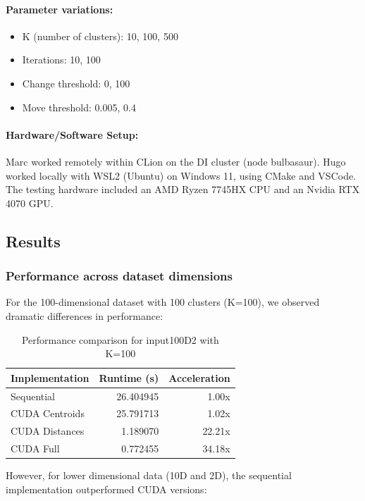 \documentclass[sigconf]{acmart}
\begin{document}
\paragraph{Parameter variations:} 
\begin{itemize}
    \item K (number of clusters): 10, 100, 500
    \item Iterations: 10, 100
    \item Change threshold: 0, 100
    \item Move threshold: 0.005, 0.4
\end{itemize}

\paragraph{Hardware/Software Setup:}
Marc worked remotely within CLion on the DI cluster (node bulbasaur). Hugo worked locally with WSL2 (Ubuntu) on Windows 11, using CMake and VSCode. The testing hardware included an AMD Ryzen 7745HX CPU and an Nvidia RTX 4070 GPU.


\subsection{Results}
\subsubsection{Performance across dataset dimensions}

For the 100-dimensional dataset with 100 clusters (K=100), we observed dramatic differences in performance:

\begin{table}[h]
\centering
\begin{tabular}{|l|r|r|}
\hline
\textbf{Implementation} & \textbf{Runtime (s)} & \textbf{Acceleration} \\
\hline
Sequential & 26.404945 & 1.00x \\
\hline
CUDA Centroids & 25.791713 & 1.02x \\
\hline
CUDA Distances & 1.189070 & 22.21x \\
\hline
CUDA Full & 0.772455 & 34.18x \\
\hline
\end{tabular}
\caption{Performance comparison for input100D2 with K=100}
\end{table}

However, for lower dimensional data (10D and 2D), the sequential implementation outperformed CUDA versions:
\end{document}
